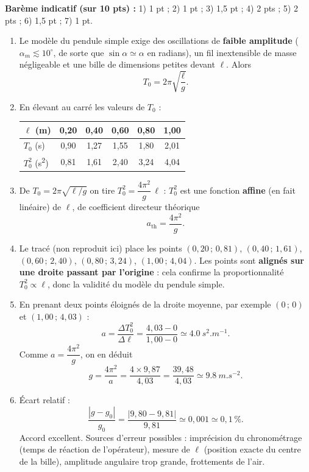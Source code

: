 \documentclass[11pt]{article}
\begin{document}
\begin{corrige}
\textbf{Barème indicatif (sur 10 pts) :} 1) 1 pt ; 2) 1 pt ; 3) 1,5 pt ; 4) 2 pts ; 5) 2 pts ; 6) 1,5 pt ; 7) 1 pt.
\begin{enumerate}
\item Le modèle du pendule simple exige des oscillations de \textbf{faible amplitude} ($\alpha_m \lesssim 10^{\circ}$, de sorte que $\sin\alpha \simeq \alpha$ en radians), un fil inextensible de masse négligeable et une bille de dimensions petites devant $\ell$. Alors
\[ T_0 = 2\pi\sqrt{\dfrac{\ell}{g}}. \]
\item En élevant au carré les valeurs de $T_0$ :
\begin{center}
\begin{tabular}{|l|*{5}{c|}}
\hline
$\ell$ (m) & 0,20 & 0,40 & 0,60 & 0,80 & 1,00 \\
\hline
$T_0$ (s) & 0,90 & 1,27 & 1,55 & 1,80 & 2,01 \\
\hline
$T_0^2$ (\si{s^2}) & 0,81 & 1,61 & 2,40 & 3,24 & 4,04 \\
\hline
\end{tabular}
\end{center}
\item De $T_0 = 2\pi\sqrt{\ell/g}$ on tire $T_0^2 = \dfrac{4\pi^2}{g}\,\ell$ : $T_0^2$ est une fonction \textbf{affine} (en fait linéaire) de $\ell$, de coefficient directeur théorique
\[ a_{\text{th}} = \dfrac{4\pi^2}{g}. \]
\item Le tracé (non reproduit ici) place les points $(0{,}20\,;\,0{,}81)$, $(0{,}40\,;\,1{,}61)$, $(0{,}60\,;\,2{,}40)$, $(0{,}80\,;\,3{,}24)$, $(1{,}00\,;\,4{,}04)$. Les points sont \textbf{alignés sur une droite passant par l'origine} : cela confirme la proportionnalité $T_0^2 \propto \ell$, donc la validité du modèle du pendule simple.
\item En prenant deux points éloignés de la droite moyenne, par exemple $(0\,;\,0)$ et $(1{,}00\,;\,4{,}03)$ :
\[ a = \dfrac{\Delta T_0^2}{\Delta \ell} = \dfrac{4{,}03 - 0}{1{,}00 - 0} \simeq \SI{4,0}{s^2.m^{-1}}. \]
Comme $a = \dfrac{4\pi^2}{g}$, on en déduit
\[ g = \dfrac{4\pi^2}{a} = \dfrac{4\times 9{,}87}{4{,}03} = \dfrac{39{,}48}{4{,}03} \simeq \SI{9,8}{m.s^{-2}}. \]
\item Écart relatif :
\[ \dfrac{|g - g_0|}{g_0} = \dfrac{|9{,}80 - 9{,}81|}{9{,}81} \simeq 0{,}001 \simeq 0{,}1\,\%. \]
Accord excellent. Sources d'erreur possibles : imprécision du chronométrage (temps de réaction de l'opérateur), mesure de $\ell$ (position exacte du centre de la bille), amplitude angulaire trop grande, frottements de l'air.

\end{enumerate}
\end{corrige}
\end{document}
